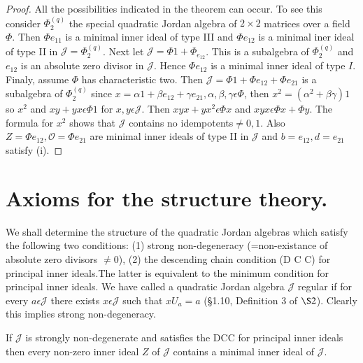 \begin{proof}
All the possibilities indicated in the theorem can occur. To see this
consider $\Phi^{(q)}_2$ the special quadratic Jordan algebra of
$2\times 2$ matrices over a field $\Phi$. Then $\Phi e_{11}$ is a
minimal inner ideal of type III and $\Phi e_{12}$ is a minimal iner
ideal of type II in $\mathscr{J}=\Phi^{(q)}_2$. Next let
$\mathscr{J}=\Phi 1+\Phi_{e_{12}}$. This is a subalgebra of
$\Phi_2^{(q)}$ and $e_{12}$ is an absolute zero divisor in
$\mathscr{J}$. Hence $\Phi e_{12}$ is a minimal inner ideal of type
$I$. Finaly, assume $\Phi$ has characteristic two. Then
$\mathscr{J}=\Phi 1+\Phi e_{12}+\Phi e_{21}$ is a subalgebra of
$\Phi^{(q)}_2$ since $x=\alpha 1+\beta e_{12}+\gamma e_{21},\alpha,
\beta, \gamma \epsilon \Phi$, then $x^{2}=(\alpha^{2}+\beta \gamma)1$
so $x^{2}$ and $xy+yx\epsilon \Phi 1$ for $x,y\epsilon
\mathscr{J}$. Then $xyx+yx^{2}\epsilon \Phi x$ and $xyx\epsilon \Phi
x+\Phi y$. The formula for $x^{2}$ shows that $\mathscr{J}$ contains
no idempotents\pageoriginale $\neq 0,1$. Also $Z=\Phi
e_{12},\mathscr{O}=\Phi e_{21}$ are minimal inner ideals of type II in
$\mathscr{J}$ and $b=e_{12},d=e_{21}$ satisfy (i).
\end{proof}

\section{Axioms for the structure theory.}\label{c3:sec5}

We shall determine the structure of the quadratic Jordan algebras
which satisfy the following two conditions: (1) strong non-degeneracy
(=non-existance of absolute zero divisors $\neq 0$), (2) the
descending chain condition (D C C) for principal inner ideals.The
latter is equivalent to the minimum condition for principal inner
ideals. We have called a quadratic Jordan algebra $\mathscr{J}$
regular if for every $a\epsilon \mathscr{J}$ there exists $x\epsilon
\mathscr{J}$ such that $xU_a=a$ (\S 1.10, Definition $3$ of $\S
2$). Clearly this implies strong non-degeneracy.

\setcounter{lemma}{0}
\begin{lemma}\label{c3:sec5:lem1}
  If $\mathscr{J}$ is strongly non-degenerate and satisfies the DCC for
  principal inner ideals then every non-zero inner ideal $Z$
  of $\mathscr{J}$ contains a minimal inner ideal of $\mathscr{J}$.
\end{lemma}

